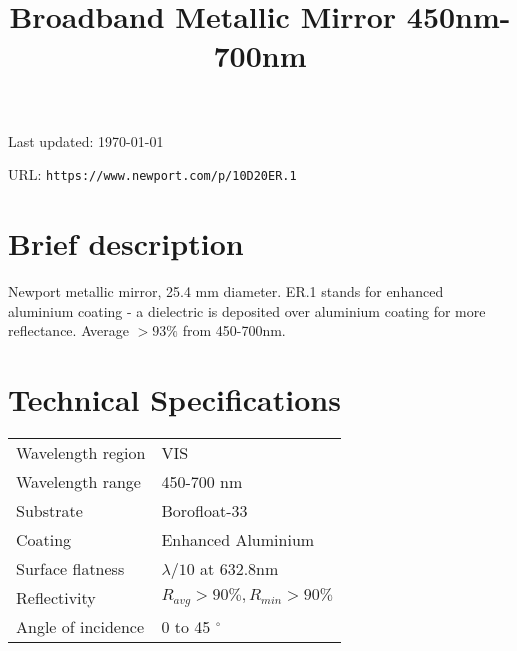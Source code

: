\documentclass{article}
\title{\vspace{-4cm}Broadband Metallic Mirror 450nm-700nm}
\date{}
\begin{document}
\maketitle

\vspace{-1cm}

Last updated: \today

URL: \texttt{https://www.newport.com/p/10D20ER.1}

\begin{multicols}{2}

\section{Brief description}


Newport metallic mirror, 25.4 mm diameter. ER.1 stands for enhanced aluminium coating - a dielectric is deposited over aluminium coating for more reflectance. Average $>93\%$ from 450-700nm.



\section{Technical Specifications}

\begin{tabular}{|l|l|}
Wavelength region & VIS \\
Wavelength range & 450-700 nm \\
Substrate & Borofloat-33\\
Coating & Enhanced Aluminium \\
Surface flatness & $\lambda/10$ at 632.8nm \\
Reflectivity & $R_{avg} > 90\%, R_{min} > 90\%$\\
Angle of incidence & 0 to 45 $^{\circ}$ \\
\end{tabular}%


\end{multicols}
\end{document}
